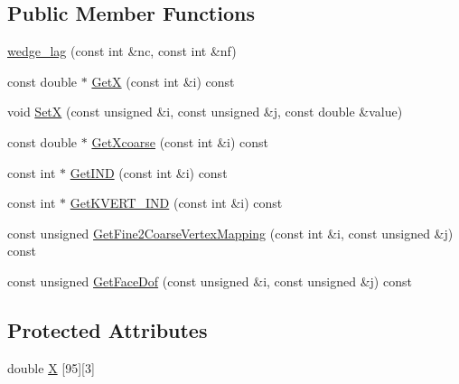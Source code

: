 \subsection*{Public Member Functions}
\begin{DoxyCompactItemize}
\item 
\mbox{\hyperlink{classfemus_1_1wedge__lag_a53d4803bd42f008dd251c5279482b81d}{wedge\+\_\+lag}} (const int \&nc, const int \&nf)
\item 
const double $\ast$ \mbox{\hyperlink{classfemus_1_1wedge__lag_a61a63f8c6773d01c707d49a3038951b3}{GetX}} (const int \&i) const
\item 
void \mbox{\hyperlink{classfemus_1_1wedge__lag_ad022f16d731698ddaeb7113d01e588cb}{SetX}} (const unsigned \&i, const unsigned \&j, const double \&value)
\item 
const double $\ast$ \mbox{\hyperlink{classfemus_1_1wedge__lag_a3cd96af653ca43643e6fd8a7a53cda07}{Get\+Xcoarse}} (const int \&i) const
\item 
const int $\ast$ \mbox{\hyperlink{classfemus_1_1wedge__lag_a984c32fdfe395886e9cba8a335f845b7}{Get\+I\+ND}} (const int \&i) const
\item 
const int $\ast$ \mbox{\hyperlink{classfemus_1_1wedge__lag_ac966f6d982d2a0aa7231ae1a5e731800}{Get\+K\+V\+E\+R\+T\+\_\+\+I\+ND}} (const int \&i) const
\item 
const unsigned \mbox{\hyperlink{classfemus_1_1wedge__lag_a2e69a8ef73eaecbf5b5abf5db49c3dec}{Get\+Fine2\+Coarse\+Vertex\+Mapping}} (const int \&i, const unsigned \&j) const
\item 
const unsigned \mbox{\hyperlink{classfemus_1_1wedge__lag_a3c027b9b1360d01725004434e89b671d}{Get\+Face\+Dof}} (const unsigned \&i, const unsigned \&j) const
\end{DoxyCompactItemize}
\subsection*{Protected Attributes}
\begin{DoxyCompactItemize}
\item 
double \mbox{\hyperlink{classfemus_1_1wedge__lag_a80c1cf4043f99ba0af70d1dd1a436730}{X}} \mbox{[}95\mbox{]}\mbox{[}3\mbox{]}
\end{DoxyCompactItemize}
